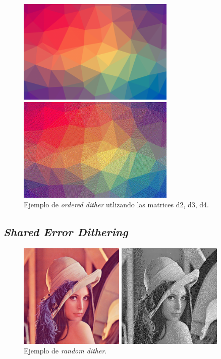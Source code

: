 \documentclass[conference]{IEEEtran}
\begin{document}
\begin{figure}[htbp]
\centerline{\includegraphics[height=50mm]{code/colors}}
\centerline{\includegraphics[height=50mm]{code/colors1}}
\caption{Ejemplo de \textit{ordered dither} utlizando las matrices d2, d3, d4.}
\label{errorColorTriangle}
\end{figure}

\subsection{\textit{Shared Error Dithering}}




\begin{figure}[htbp]
\centerline{\includegraphics[height=50mm]{code/lena}}
\centerline{\includegraphics[height=50mm]{code/error_dither_lena}}
\caption{Ejemplo de \textit{random dither}.}
\label{errorGray}
\end{figure}
\end{document}
